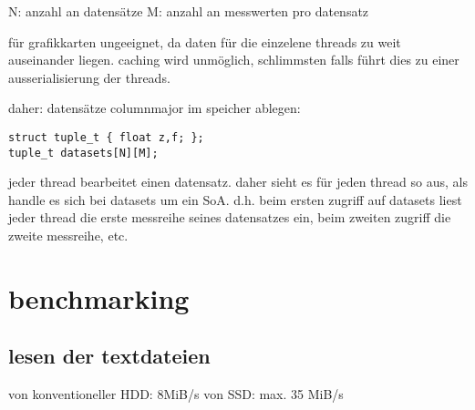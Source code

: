 N: anzahl an datensätze
M: anzahl an messwerten pro datensatz

für grafikkarten ungeeignet, da daten für die einzelene threads zu weit auseinander liegen. caching wird unmöglich, schlimmsten falls führt dies zu einer ausserialisierung der threads.

daher: datensätze columnmajor im speicher ablegen:

\begin{lstlisting}
struct tuple_t { float z,f; };
tuple_t datasets[N][M];
\end{lstlisting}

jeder thread bearbeitet einen datensatz. daher sieht es für jeden thread so aus, als handle es sich bei datasets um ein SoA. d.h. beim ersten zugriff auf datasets liest jeder thread die erste messreihe seines datensatzes ein, beim zweiten zugriff die zweite messreihe, etc.


\chapter{benchmarking}
\section{lesen der textdateien}
von konventioneller HDD: 8MiB/s
von SSD: max. 35 MiB/s
